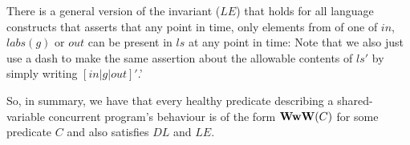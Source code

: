 There is a general version of the invariant ($LE$) that holds
for all language constructs that asserts that any point in time,
only elements from of one of $in$, $labs(g)$ or $out$
can be present in $ls$ at any point in time:
Note that we also just use a dash to make
the same assertion about the allowable contents of $ls'$
by simply writing $[in|g|out]'$.'

So, in summary, we have that every healthy predicate describing
a shared-variable concurrent program's behaviour is of the form $\mathbf{WwW}(C)$
for some predicate $C$ and also satisfies $DL$ and  $LE$.
